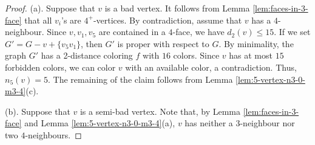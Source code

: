 \documentclass[12pt, reqno]{amsart}
\theoremstyle{plain}
\newtheorem{corollary}[equation]{Corollary}
\theoremstyle{definition}
\numberwithin{equation}{section}
\begin{document}
\begin{proof} 
(a). Suppose that $v$ is a bad vertex. It follows from Lemma \ref{lem:faces-in-3-face}  that all $v_i$'s are $4^+$-vertices. By contradiction, assume that $v$ has a $4$-neighbour. Since $v,v_1,v_5$ are contained in a $4$-face, we have $d_2(v)\leq 15$. If we set $G'=G-v+\{v_5v_1\}$, then  $G'$ is proper with respect to $G$. By minimality, the graph $G'$ has a 2-distance coloring $f$ with $16$ colors. Since $v$ has at most $15$ forbidden colors, we can color $v$ with an available color, a contradiction. Thus, $n_5(v)=5$. The remaining of the claim follows from Lemma \ref{lem:5-vertex-n3-0-m3-4}(c).


(b). Suppose that $v$ is a semi-bad vertex. Note that, by Lemma \ref{lem:faces-in-3-face} and Lemma \ref{lem:5-vertex-n3-0-m3-4}(a), $v$ has neither a $3$-neighbour nor two $4$-neighbours.
\end{proof}


%
\end{document}
